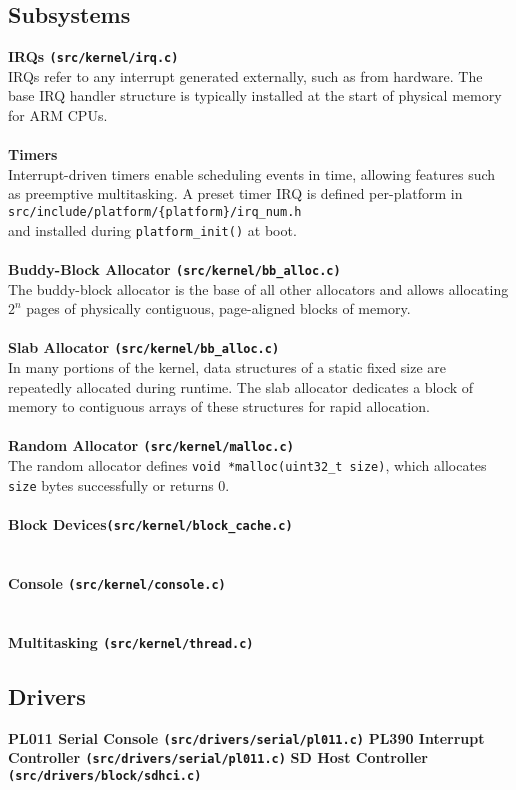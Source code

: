 \documentclass[a4paper,12pt]{refrep}
\newcommand{\code}[1]{\colorbox{light-gray}{\texttt{#1}}}
\begin{document}
\newpage
\subsection{Subsystems}
{\bf IRQs {\bf \code{(src/kernel/irq.c)}}} \\
IRQs refer to any interrupt generated externally, such as from hardware.
The base IRQ handler structure is typically installed at the start of physical memory for ARM CPUs.
\\
\\
{\bf Timers } \\
Interrupt-driven timers enable scheduling events in time, allowing features such as preemptive multitasking.
A preset timer IRQ is defined per-platform in \\ \code{src/include/platform/\{platform\}/irq\_num.h} \\ and installed during \code{platform\_init()} at boot.
\\
\\
{\bf Buddy-Block Allocator {\bf \code{(src/kernel/bb\_alloc.c)}}} \\
The buddy-block allocator is the base of all other allocators and allows allocating $2^n$ pages of physically contiguous, page-aligned blocks of memory. 
\\
\\
{\bf Slab Allocator {\bf \code{(src/kernel/bb\_alloc.c)}}} \\
In many portions of the kernel, data structures of a 
static fixed size are repeatedly allocated during runtime. 
The slab allocator dedicates a block of memory to contiguous 
arrays of these structures for rapid allocation.
\\
\\
{\bf Random Allocator {\bf \code{(src/kernel/malloc.c)}}} \\
The random allocator defines \code{void *malloc(uint32\_t size)}, which allocates \code{size} bytes successfully or returns 0. 
\\
\\
{\bf Block Devices{\bf \code{(src/kernel/block\_cache.c)}}}
\\
\\
\\
{\bf Console {\bf \code{(src/kernel/console.c)}}}
\\
\\
\\
{\bf Multitasking {\bf \code{(src/kernel/thread.c)}}}




\subsection{Drivers}
{\bf PL011 Serial Console {\bf \code{(src/drivers/serial/pl011.c)}}}
{\bf PL390 Interrupt Controller {\bf \code{(src/drivers/serial/pl011.c)}}}
{\bf SD Host Controller {\bf \code{(src/drivers/block/sdhci.c)}}}
\end{document}
